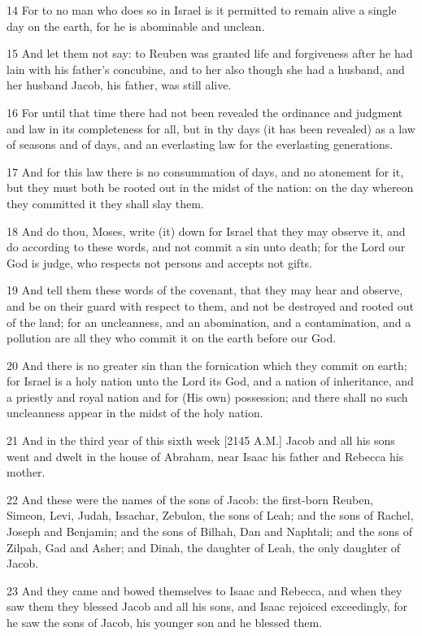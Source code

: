 \par 14 For to no man who does so in Israel is it permitted to remain alive a single day on the earth, for he is abominable and unclean.
\par 15 And let them not say: to Reuben was granted life and forgiveness after he had lain with his father's concubine, and to her also though she had a husband, and her husband Jacob, his father, was still alive.
\par 16 For until that time there had not been revealed the ordinance and judgment and law in its completeness for all, but in thy days (it has been revealed) as a law of seasons and of days, and an everlasting law for the everlasting generations.
\par 17 And for this law there is no consummation of days, and no atonement for it, but they must both be rooted out in the midst of the nation: on the day whereon they committed it they shall slay them.
\par 18 And do thou, Moses, write (it) down for Israel that they may observe it, and do according to these words, and not commit a sin unto death; for the Lord our God is judge, who respects not persons and accepts not gifts.
\par 19 And tell them these words of the covenant, that they may hear and observe, and be on their guard with respect to them, and not be destroyed and rooted out of the land; for an uncleanness, and an abomination, and a contamination, and a pollution are all they who commit it on the earth before our God.
\par 20 And there is no greater sin than the fornication which they commit on earth; for Israel is a holy nation unto the Lord its God, and a nation of inheritance, and a priestly and royal nation and for (His own) possession; and there shall no such uncleanness appear in the midst of the holy nation.
\par 21 And in the third year of this sixth week [2145 A.M.] Jacob and all his sons went and dwelt in the house of Abraham, near Isaac his father and Rebecca his mother.
\par 22 And these were the names of the sons of Jacob: the first-born Reuben, Simeon, Levi, Judah, Issachar, Zebulon, the sons of Leah; and the sons of Rachel, Joseph and Benjamin; and the sons of Bilhah, Dan and Naphtali; and the sons of Zilpah, Gad and Asher; and Dinah, the daughter of Leah, the only daughter of Jacob.
\par 23 And they came and bowed themselves to Isaac and Rebecca, and when they saw them they blessed Jacob and all his sons, and Isaac rejoiced exceedingly, for he saw the sons of Jacob, his younger son and he blessed them.

